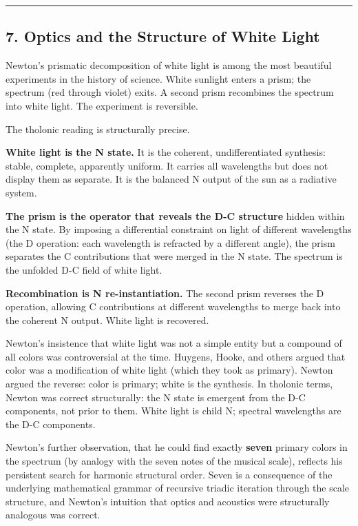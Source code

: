 \documentclass[
  11pt,
  letterpaper,
]{article}
\begin{document}
\begin{center}\rule{0.5\linewidth}{0.5pt}\end{center}

\subsection{7. Optics and the Structure of White
Light}\label{optics-and-the-structure-of-white-light}

Newton's prismatic decomposition of white light is among the most
beautiful experiments in the history of science. White sunlight enters a
prism; the spectrum (red through violet) exits. A second prism
recombines the spectrum into white light. The experiment is reversible.

The tholonic reading is structurally precise.

\textbf{White light is the N state.} It is the coherent,
undifferentiated synthesis: stable, complete, apparently uniform. It
carries all wavelengths but does not display them as separate. It is the
balanced N output of the sun as a radiative system.

\textbf{The prism is the operator that reveals the D-C structure} hidden
within the N state. By imposing a differential constraint on light of
different wavelengths (the D operation: each wavelength is refracted by
a different angle), the prism separates the C contributions that were
merged in the N state. The spectrum is the unfolded D-C field of white
light.

\textbf{Recombination is N re-instantiation.} The second prism reverses
the D operation, allowing C contributions at different wavelengths to
merge back into the coherent N output. White light is recovered.

Newton's insistence that white light was not a simple entity but a
compound of all colors was controversial at the time. Huygens, Hooke,
and others argued that color was a modification of white light (which
they took as primary). Newton argued the reverse: color is primary;
white is the synthesis. In tholonic terms, Newton was correct
structurally: the N state is emergent from the D-C components, not prior
to them. White light is child N; spectral wavelengths are the D-C
components.

Newton's further observation, that he could find exactly \textbf{seven}
primary colors in the spectrum (by analogy with the seven notes of the
musical scale), reflects his persistent search for harmonic structural
order. Seven is a consequence of the underlying mathematical grammar of
recursive triadic iteration through the scale structure, and Newton's
intuition that optics and acoustics were structurally analogous was
correct.
\end{document}
